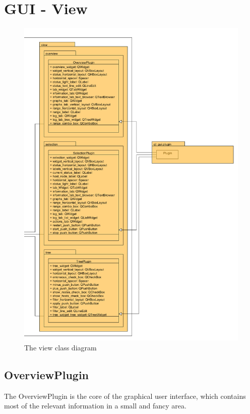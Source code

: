 \newpage
\section{GUI - View}
\begin{figure}[!ht]
\begin{center}
\includegraphics[width=0.8\linewidth]{./bilder/view.png}
\caption{The view class diagram}
\end{center}
\end{figure}

\subsection{OverviewPlugin}
The OverviewPlugin is the core of the graphical user interface, which
contains most of the relevant information in a small and fancy area.
